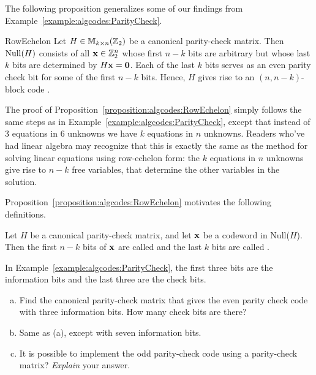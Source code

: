 The following proposition generalizes some of our findings from Example~\ref{example:algcodes:ParityCheck}.

\begin{prop}{RowEchelon}
Let $H \in {\Bbb M}_{k \times n}({\Bbb Z}_2)$ be a canonical
parity-check matrix. Then ${\rm Null}(H)$ consists of all 
${\bold x} \in {\Bbb
Z}_2^n$ whose first $n-k$ bits are arbitrary but whose last $k$ bits
are determined by $H{\bold x} = {\bold 0}$. Each of
the last $k$ bits serves as an even parity check bit for some of the
first $n-k$ bits. Hence, $H$ gives rise to an $(n, n-k)$-block code . 
\end{prop}

The proof of Proposition~\ref{proposition:algcodes:RowEchelon} simply follows the same steps as in Example~\ref{example:algcodes:ParityCheck}, except that instead of 3 equations in 6 unknowns we have $k$ equations in $n$ unknowns. Readers who've had linear algebra may recognize that this is exactly the same as the method for solving linear equations using row-echelon form: the $k$ equations in $n$ unknowns give rise to $n-k$ free variables, that determine the other variables in the solution.

 Proposition~\ref{proposition:algcodes:RowEchelon} motivates the following definitions.
 
 \begin{defn}
 Let $H$ be a canonical parity-check matrix, and let ${\bold x}$ be a codeword in Null($H$). Then the first $n-k$ bits of ${\bold x}$ are called   and the last $k$ bits are called .
\end{defn}
In Example~\ref{example:algcodes:ParityCheck}, the first three bits are the information bits
and the last three are the check bits.
 
\begin{exercise}{}
\begin{enumerate}[(a)]
\item
Find the canonical parity-check matrix that gives the even parity check code with three information bits. How many check bits are there?
\item
Same as (a), except with seven information bits.
\item
It is possible to implement the odd parity-check code using a parity-check matrix?  \emph{Explain} your answer.
\end{enumerate}
\end{exercise}

